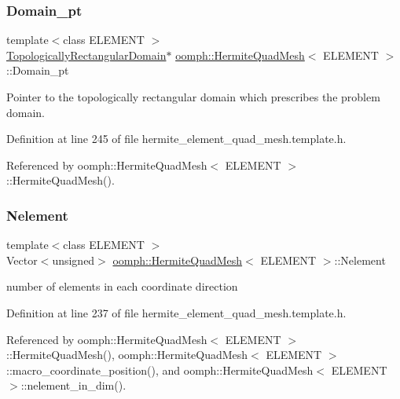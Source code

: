 \subsubsection{\texorpdfstring{Domain\+\_\+pt}{Domain\_pt}}
{\footnotesize\ttfamily template$<$class E\+L\+E\+M\+E\+NT $>$ \\
\hyperlink{classoomph_1_1TopologicallyRectangularDomain}{Topologically\+Rectangular\+Domain}$\ast$ \hyperlink{classoomph_1_1HermiteQuadMesh}{oomph\+::\+Hermite\+Quad\+Mesh}$<$ E\+L\+E\+M\+E\+NT $>$\+::Domain\+\_\+pt\hspace{0.3cm}{\ttfamily [private]}}



Pointer to the topologically rectangular domain which prescribes the problem domain. 



Definition at line 245 of file hermite\+\_\+element\+\_\+quad\+\_\+mesh.\+template.\+h.



Referenced by oomph\+::\+Hermite\+Quad\+Mesh$<$ E\+L\+E\+M\+E\+N\+T $>$\+::\+Hermite\+Quad\+Mesh().

\mbox{\label{classoomph_1_1HermiteQuadMesh_a0d02ca1a2769955ce57f09616195bd27}} 
\subsubsection{\texorpdfstring{Nelement}{Nelement}}
{\footnotesize\ttfamily template$<$class E\+L\+E\+M\+E\+NT $>$ \\
Vector$<$unsigned$>$ \hyperlink{classoomph_1_1HermiteQuadMesh}{oomph\+::\+Hermite\+Quad\+Mesh}$<$ E\+L\+E\+M\+E\+NT $>$\+::Nelement\hspace{0.3cm}{\ttfamily [private]}}



number of elements in each coordinate direction 



Definition at line 237 of file hermite\+\_\+element\+\_\+quad\+\_\+mesh.\+template.\+h.



Referenced by oomph\+::\+Hermite\+Quad\+Mesh$<$ E\+L\+E\+M\+E\+N\+T $>$\+::\+Hermite\+Quad\+Mesh(), oomph\+::\+Hermite\+Quad\+Mesh$<$ E\+L\+E\+M\+E\+N\+T $>$\+::macro\+\_\+coordinate\+\_\+position(), and oomph\+::\+Hermite\+Quad\+Mesh$<$ E\+L\+E\+M\+E\+N\+T $>$\+::nelement\+\_\+in\+\_\+dim().

